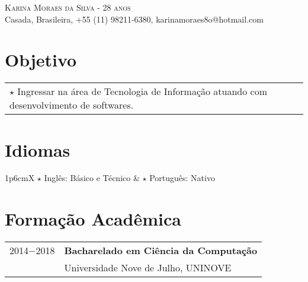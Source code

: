 \documentclass[a4paper, oneside, final]{scrartcl}
\newcommand{\vspc}{\vspace{0.15cm}} %
\begin{document}
\begin{center}
\textsc{\Huge{Karina Moraes da Silva - 28 anos}} \vspc\\
{\small Casada, Brasileira, +55 (11) 98211-6380, karinamoraes8o@hotmail.com} 





\section{Objetivo}
\begin{tabularx}{1\linewidth}{X}
	$\star$ Ingressar na área de Tecnologia de Informação atuando com desenvolvimento de softwares. \vspc\\

\end{tabularx}

\section{Idiomas}
\begin{tabularx}{1\linewidth}{p{6cm}X}
$\star$ Inglês: Básico e Técnico & $\star$ Português: Nativo\\
\end{tabularx}


\section{Formação Acadêmica}
\begin{tabularx}{1\linewidth}{p{2cm}X}
2014$-$2018 & {\bf Bacharelado em Ciência da Computação}\\
            & Universidade Nove de Julho, UNINOVE\\
\end{tabularx}


\end{center}
\end{document}
